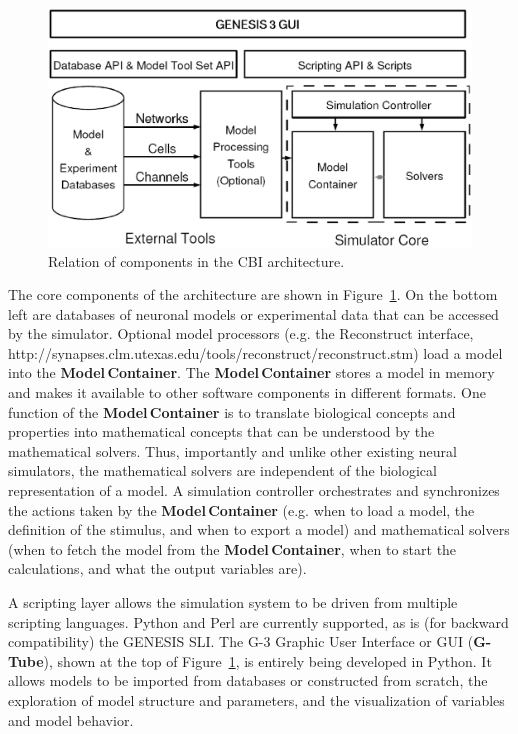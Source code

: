 \documentclass[12pt]{article}
\begin{document}
\begin{figure}[ht]
  \centering
    \includegraphics[scale=0.4]{figures/G3arch.eps}
  \caption{Relation of components in the CBI architecture.}
  \label{fig:cbi-arch}
\end{figure}

The core components of the architecture are shown in
Figure~\ref{fig:cbi-arch}. On the bottom left are databases of
neuronal models or experimental data that can be accessed by the
simulator. Optional model processors (e.g. the Reconstruct interface, http://synapses.clm.utexas.edu/tools/reconstruct/reconstruct.stm)
load a model into the {\bf Model\,Container}.  The {\bf
  Model\,Container} stores a model in memory and makes it available to
other software components in different formats.  One function of the
{\bf Model\,Container} is to translate biological concepts and
properties into mathematical concepts that can be understood by the
mathematical solvers. Thus, importantly and unlike other existing
neural simulators, the mathematical solvers are independent of the
biological representation of a model. A simulation controller
orchestrates and synchronizes the actions taken by the {\bf
  Model\,Container} (e.g. when to load a model, the definition of the
stimulus, and when to export a model) and mathematical solvers (when
to fetch the model from the {\bf Model\,Container}, when to start the
calculations, and what the output variables are).

A scripting layer allows the simulation system to be driven from
multiple scripting languages. Python and Perl are currently supported,
as is (for backward compatibility) the GENESIS SLI. The G-3 Graphic
User Interface or GUI ({\bf G-Tube}), shown at the top of
Figure~\ref{fig:cbi-arch}, is entirely being developed in Python.  It
allows models to be imported from databases or constructed from
scratch, the exploration of model structure and parameters, and the
visualization of variables and model behavior.
\end{document}
